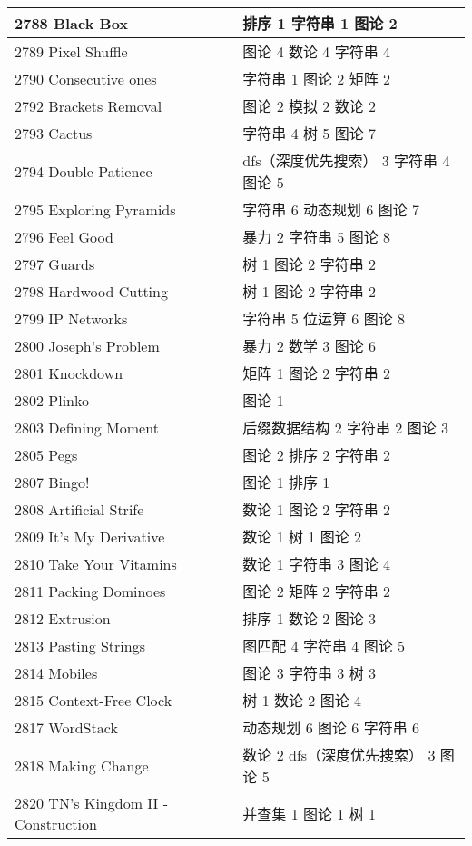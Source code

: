 \begin{longtable}{| p{} | p{} |}
 2788 Black Box  & 排序 1 字符串 1 图论 2 \\ \hline
 2789 Pixel Shuffle  & 图论 4 数论 4 字符串 4 \\ \hline
 2790 Consecutive ones  & 字符串 1 图论 2 矩阵 2 \\ \hline
 2792 Brackets Removal  & 图论 2 模拟 2 数论 2 \\ \hline
 2793 Cactus  & 字符串 4 树 5 图论 7 \\ \hline
 2794 Double Patience  & dfs（深度优先搜索） 3 字符串 4 图论 5 \\ \hline
 2795 Exploring Pyramids  & 字符串 6 动态规划 6 图论 7 \\ \hline
 2796 Feel Good  & 暴力 2 字符串 5 图论 8 \\ \hline
 2797 Guards  & 树 1 图论 2 字符串 2 \\ \hline
 2798 Hardwood Cutting  & 树 1 图论 2 字符串 2 \\ \hline
 2799 IP Networks  & 字符串 5 位运算 6 图论 8 \\ \hline
 2800 Joseph's Problem  & 暴力 2 数学 3 图论 6 \\ \hline
 2801 Knockdown  & 矩阵 1 图论 2 字符串 2 \\ \hline
 2802 Plinko  & 图论 1 \\ \hline
 2803 Defining Moment  & 后缀数据结构 2 字符串 2 图论 3 \\ \hline
 2805 Pegs  & 图论 2 排序 2 字符串 2 \\ \hline
 2807 Bingo!  & 图论 1 排序 1 \\ \hline
 2808 Artificial Strife  & 数论 1 图论 2 字符串 2 \\ \hline
 2809 It's My Derivative  & 数论 1 树 1 图论 2 \\ \hline
 2810 Take Your Vitamins  & 数论 1 字符串 3 图论 4 \\ \hline
 2811 Packing Dominoes  & 图论 2 矩阵 2 字符串 2 \\ \hline
 2812 Extrusion  & 排序 1 数论 2 图论 3 \\ \hline
 2813 Pasting Strings  & 图匹配 4 字符串 4 图论 5 \\ \hline
 2814 Mobiles  & 图论 3 字符串 3 树 3 \\ \hline
 2815 Context-Free Clock  & 树 1 数论 2 图论 4 \\ \hline
 2817 WordStack  & 动态规划 6 图论 6 字符串 6 \\ \hline
 2818 Making Change  & 数论 2 dfs（深度优先搜索） 3 图论 5 \\ \hline
 2820 TN's Kingdom II - Construction  & 并查集 1 图论 1 树 1 \\ \hline

\end{longtable}
